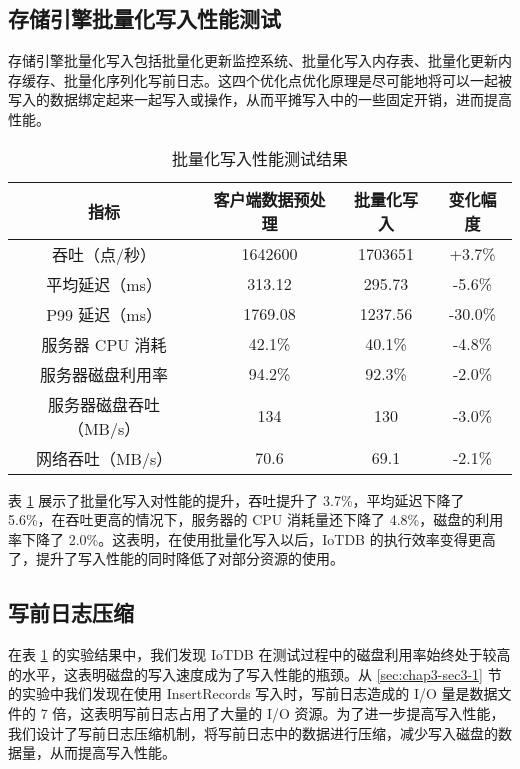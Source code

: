 \subsection{存储引擎批量化写入性能测试}
存储引擎批量化写入包括批量化更新监控系统、批量化写入内存表、批量化更新内存缓存、批量化序列化写前日志。这四个优化点优化原理是尽可能地将可以一起被写入的数据绑定起来一起写入或操作，从而平摊写入中的一些固定开销，进而提高性能。
\begin{table}
  \centering
  \caption{批量化写入性能测试结果}
  \begin{tabular}{cccc}
    \toprule 
    指标 & 客户端数据预处理 & 批量化写入 & 变化幅度 \\ 
    \midrule  
    吞吐（点/秒） & 1642600 & 1703651 & +3.7\%\\  
    平均延迟（ms） & 313.12 & 295.73 & -5.6\%\\  
    P99 延迟（ms） & 1769.08 & 1237.56 & -30.0\% \\  
    服务器 CPU 消耗 & 42.1\% & 40.1\% & -4.8\%\\  
    服务器磁盘利用率 & 94.2\% & 92.3\% & -2.0\%\\  
    服务器磁盘吞吐（MB/s） & 134 & 130 & -3.0\% \\  
    网络吞吐（MB/s） & 70.6 & 69.1 & -2.1\%\\  
    \bottomrule
  \end{tabular}
  \label{tabular:batch-write-performance}
\end{table}

表 \ref{tabular:batch-write-performance} 展示了批量化写入对性能的提升，吞吐提升了 3.7\%，平均延迟下降了 5.6\%，在吞吐更高的情况下，服务器的 CPU 消耗量还下降了 4.8\%，磁盘的利用率下降了 2.0\%。这表明，在使用批量化写入以后，IoTDB 的执行效率变得更高了，提升了写入性能的同时降低了对部分资源的使用。

\subsection{写前日志压缩}
在表 \ref{tabular:batch-write-performance} 的实验结果中，我们发现 IoTDB 在测试过程中的磁盘利用率始终处于较高的水平，这表明磁盘的写入速度成为了写入性能的瓶颈。从 \ref{sec:chap3-sec3-1} 节的实验中我们发现在使用 InsertRecords 写入时，写前日志造成的 I/O 量是数据文件的 7 倍，这表明写前日志占用了大量的 I/O 资源。为了进一步提高写入性能，我们设计了写前日志压缩机制，将写前日志中的数据进行压缩，减少写入磁盘的数据量，从而提高写入性能。

